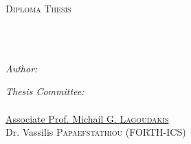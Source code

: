 \documentclass[
	12pt, %
	english,
	onehalfspacing, %
	liststotoc, %
	toctotoc, %
	parskip, %
	headsepline, %
]{MastersDoctoralThesis} %
\author{Emmanouil \textsc{Petrakos}} %
\begin{document}
\frontmatter %

\pagestyle{plain} %

\begin{titlepage}
	\begin{center}
		{\scshape\LARGE \univname\par}
		\vspace{0.5cm} %
		\textsc{\Large Diploma Thesis}\\[0.5cm] %

		\HRule \\[0.4cm] %
		{\huge \bfseries \ttitle\par}\vspace{0.4cm} %
		\HRule \\[0.4cm] %

		\begin{minipage}[t]{0.4\textwidth}
			\begin{flushleft} \large
				\emph{Author:}\\
				{\authorname} %
			\end{flushleft}
		\end{minipage}
		\begin{minipage}[t]{0.5\textwidth}
			\begin{flushright} \large
				\emph{Thesis Committee:} \\
				\href{https://www.ece.tuc.gr/index.php?id=4531&tx_tuclabspersonnel_list\%5Bperson\%5D=289&tx_tuclabspersonnel_list\%5Baction\%5D=person&tx_tuclabspersonnel_list\%5Bcontroller\%5D=List}{\supname}\\ %
				\href{https://www.ece.tuc.gr/index.php?id=4531&tx_tuclabspersonnel_list\%5Bperson\%5D=313&tx_tuclabspersonnel_list\%5Baction\%5D=person&tx_tuclabspersonnel_list\%5Bcontroller\%5D=List}{Associate Prof. Michail G. \textsc{Lagoudakis}}\\
				{Dr. Vassilis \textsc{Papaefstathiou} (FORTH-ICS)}
			\end{flushright}
		\end{minipage}\\[0.2cm]


\end{center}
\end{titlepage}
\end{document}
